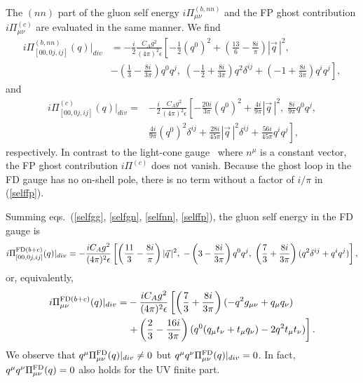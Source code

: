 \documentclass[preprint,amsmath,amssymb,superscriptaddress, floatfix,nofootinbib]{revtex4}
\begin{document}
The $(nn)$ part of the gluon self energy $i\Pi_{\mu\nu}^{(b,nn)}$ and the 
FP ghost contribution $i\Pi_{\mu\nu}^{(c)}$ are 
evaluated in the same manner. We find 
%
\begin{align}
i\Pi_{[00,0j,ij]}^{(b,nn)}(q)|_{div} &= -\frac{i}{2}\frac{C_A g^2}{(4 \pi)^2 \epsilon } 
\left[ -\frac{1}{2}(q^0)^2 +\left( \frac{13}{6}-\frac{8i}{\pi} \right) 
|\vec{q}\,|^2 ,  \right. 
\nonumber \\
& \left. 
-\left( \frac{1}{3}-\frac{8i}{3\pi} \right) q^0{q}^j , \;  
\left( -\frac{1}{2}+\frac{8i}{3\pi} \right) q^2\delta^{ij} 
+\left( -1 +\frac{8i}{3\pi} \right) {q}^i{q}^j 
\right] ,
\label{selfnn}
\end{align}
% 
and 
%
\begin{align}
i\Pi_{[00,0j,ij]}^{(c)}(q)|_{div}= & 
-\frac{i}{2}\frac{C_A g^2}{(4 \pi)^2 \epsilon } 
\left[ -\frac{20i}{3\pi}(q^0)^2 +\frac{4i}{9\pi}|\vec{q}\,|^2 , \;  
\frac{8i}{9\pi}q^0{q}^j ,  \right. 
\nonumber \\
& \left. 
\frac{4i}{9\pi}(q^0)^2\delta^{ij}+\frac{28i}{45\pi}|\vec{q}\,|^2\delta^{ij}
+\frac{56i}{45\pi} {q}^i{q}^j 
\right] , 
\label{selffp}
\end{align}
respectively. 
In contrast to the light-cone gauge~\cite{Leibbrandt:1987qv} where $n^{\mu}$ is 
a constant vector, the FP ghost contribution $i\Pi^{(c)}$ does not vanish. 
Because the ghost loop in the FD gauge has no on-shell pole, 
there is no term without a factor of $i/\pi$ in (\ref{selffp}). 

Summing eqs.~(\ref{selfgg}, \ref{selfgn}, \ref{selfnn}, \ref{selffp}), 
the gluon self energy in the FD gauge is 
%
\begin{equation}
i\Pi_{[00,0j,ij]}^{{\rm FD}(b+c)}(q)|_{div} =
-\frac{iC_A g^2}{(4 \pi)^2 \epsilon } 
\left[ \left( \frac{11}{3} -\frac{8i}{\pi} \right) |\vec{q}\,|^2 , \; 
-\left( 3-\frac{8i}{3\pi} \right) q^0{q}^j , \;  
\left( \frac{7}{3}+\frac{8i}{3\pi} \right) (q^2\delta^{ij}+{q}^i{q}^j) 
\right] ,
\label{selfenergy}
\end{equation}
%
or, equivalently, 
%
\begin{align}
i\Pi_{\mu\nu}^{{\rm FD}(b+c)}(q)|_{div} = &
-\frac{iC_A g^2}{(4 \pi)^2 \epsilon } 
\left[ 
\left( \frac{7}{3} +\frac{8i}{3\pi} \right) (-q^2 g_{\mu\nu}+q_{\mu}q_{\nu})  
\right. 
\nonumber \\ 
& \left. 
+\left( \frac{2}{3} -\frac{16i}{3\pi} \right) 
( q^0(q_{\mu}t_{\nu} +t_{\mu}q_{\nu} ) -2q^2 t_{\mu}t_{\nu} ) \right]  .
\label{selfenergy2} 
\end{align}
%
We observe that $q^{\mu}\Pi_{\mu\nu}^{\rm FD}(q)|_{div}\neq 0$ but 
$q^{\mu}q^{\nu}\Pi_{\mu\nu}^{\rm FD}(q)|_{div}=0$. 
In fact,  $q^{\mu}q^{\nu}\Pi_{\mu\nu}^{\rm FD}(q)=0$ also holds for 
the UV finite part. 
\end{document}

